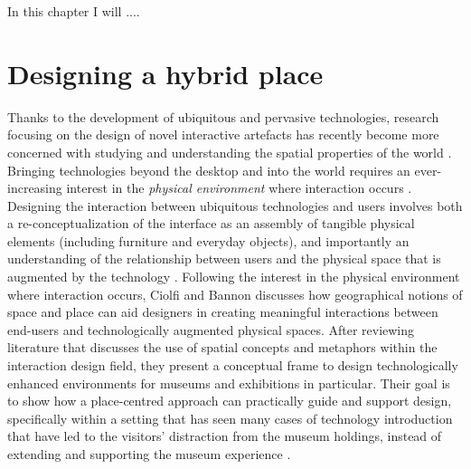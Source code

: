 In this chapter I will ....

\section{Designing a hybrid place}

Thanks to the development of ubiquitous and pervasive technologies, research focusing on the design of novel interactive artefacts has recently become more concerned with studying and understanding the spatial properties of the world \autocite[p. 159]{hybridplace_ciolfi}. Bringing technologies beyond the desktop and into the world requires an ever-increasing interest in the \emph{physical environment} where interaction occurs \autocite[p. 159]{hybridplace_ciolfi}.  Designing the interaction between ubiquitous technologies and users involves both a re-conceptualization of the interface as an assembly of tangible physical elements (including furniture and everyday objects), and importantly an understanding of the relationship between users and the physical space that is augmented by the technology \autocite[p. 159]{hybridplace_ciolfi}. Following the interest in the physical environment where interaction occurs, Ciolfi and Bannon discusses how geographical notions of space and place can aid designers in creating meaningful interactions between end-users and technologically augmented physical spaces. After reviewing literature that discusses the use of spatial concepts and metaphors within the interaction design field, they present a conceptual frame to design technologically enhanced environments for museums and exhibitions in particular. Their goal is to show how a place-centred approach can practically guide and support design, specifically within a setting that has seen many cases of technology introduction that have led to the visitors' distraction from the museum holdings, instead of extending and supporting the museum experience \autocite[p. 159-160]{hybridplace_ciolfi}.




